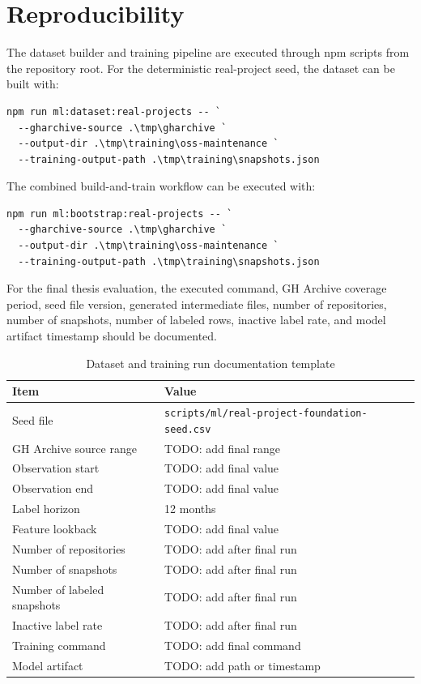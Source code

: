 \section{Reproducibility}
\label{sec:method-reproducibility}

The dataset builder and training pipeline are executed through npm scripts from the repository root. For the deterministic real-project seed, the dataset can be built with:

\begin{verbatim}
npm run ml:dataset:real-projects -- `
  --gharchive-source .\tmp\gharchive `
  --output-dir .\tmp\training\oss-maintenance `
  --training-output-path .\tmp\training\snapshots.json
\end{verbatim}

The combined build-and-train workflow can be executed with:

\begin{verbatim}
npm run ml:bootstrap:real-projects -- `
  --gharchive-source .\tmp\gharchive `
  --output-dir .\tmp\training\oss-maintenance `
  --training-output-path .\tmp\training\snapshots.json
\end{verbatim}

For the final thesis evaluation, the executed command, GH Archive coverage period, seed file version, generated intermediate files, number of repositories, number of snapshots, number of labeled rows, inactive label rate, and model artifact timestamp should be documented.

\begin{table}[htbp]
\centering
\caption{Dataset and training run documentation template}
\label{tab:method-run-documentation}
\begin{tabular}{p{} p{}}
\hline
\textbf{Item} & \textbf{Value} \\
\hline
Seed file & \texttt{scripts/ml/real-project-foundation-seed.csv} \\
GH Archive source range & TODO: add final range \\
Observation start & TODO: add final value \\
Observation end & TODO: add final value \\
Label horizon & 12 months \\
Feature lookback & TODO: add final value \\
Number of repositories & TODO: add after final run \\
Number of snapshots & TODO: add after final run \\
Number of labeled snapshots & TODO: add after final run \\
Inactive label rate & TODO: add after final run \\
Training command & TODO: add final command \\
Model artifact & TODO: add path or timestamp \\
\hline
\end{tabular}
\end{table}

